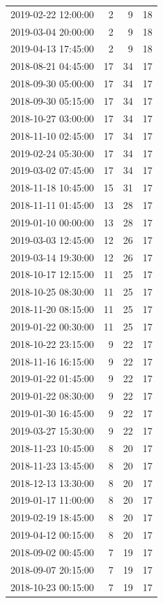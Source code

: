 \begin{tabular}{lrrr}
2019-02-22 12:00:00 & 2 & 9 & 18 \\
2019-03-04 20:00:00 & 2 & 9 & 18 \\
2019-04-13 17:45:00 & 2 & 9 & 18 \\
2018-08-21 04:45:00 & 17 & 34 & 17 \\
2018-09-30 05:00:00 & 17 & 34 & 17 \\
2018-09-30 05:15:00 & 17 & 34 & 17 \\
2018-10-27 03:00:00 & 17 & 34 & 17 \\
2018-11-10 02:45:00 & 17 & 34 & 17 \\
2019-02-24 05:30:00 & 17 & 34 & 17 \\
2019-03-02 07:45:00 & 17 & 34 & 17 \\
2018-11-18 10:45:00 & 15 & 31 & 17 \\
2018-11-11 01:45:00 & 13 & 28 & 17 \\
2019-01-10 00:00:00 & 13 & 28 & 17 \\
2019-03-03 12:45:00 & 12 & 26 & 17 \\
2019-03-14 19:30:00 & 12 & 26 & 17 \\
2018-10-17 12:15:00 & 11 & 25 & 17 \\
2018-10-25 08:30:00 & 11 & 25 & 17 \\
2018-11-20 08:15:00 & 11 & 25 & 17 \\
2019-01-22 00:30:00 & 11 & 25 & 17 \\
2018-10-22 23:15:00 & 9 & 22 & 17 \\
2018-11-16 16:15:00 & 9 & 22 & 17 \\
2019-01-22 01:45:00 & 9 & 22 & 17 \\
2019-01-22 08:30:00 & 9 & 22 & 17 \\
2019-01-30 16:45:00 & 9 & 22 & 17 \\
2019-03-27 15:30:00 & 9 & 22 & 17 \\
2018-11-23 10:45:00 & 8 & 20 & 17 \\
2018-11-23 13:45:00 & 8 & 20 & 17 \\
2018-12-13 13:30:00 & 8 & 20 & 17 \\
2019-01-17 11:00:00 & 8 & 20 & 17 \\
2019-02-19 18:45:00 & 8 & 20 & 17 \\
2019-04-12 00:15:00 & 8 & 20 & 17 \\
2018-09-02 00:45:00 & 7 & 19 & 17 \\
2018-09-07 20:15:00 & 7 & 19 & 17 \\
2018-10-23 00:15:00 & 7 & 19 & 17 \\

\end{tabular}
